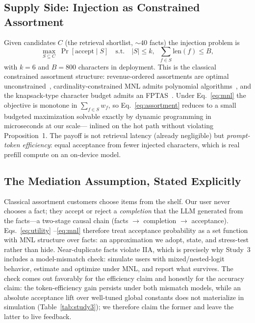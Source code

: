\documentclass[letterpaper]{article}
\begin{document}
\subsection{Supply Side: Injection as Constrained Assortment}

Given candidates $C$ (the retrieval shortlist, ${\sim}40$ facts) the
injection problem is
\begin{equation}
\label{eq:assortment}
\max_{S \subseteq C} \;\Pr[\text{accept} \mid S]
\quad \text{s.t.} \quad |S| \le k, \;\;
\sum_{f \in S} \mathrm{len}(f) \le B,
\end{equation}
with $k{=}6$ and $B{=}800$ characters in deployment. This is the classical
constrained assortment structure: revenue-ordered assortments are optimal
unconstrained~\citep{talluri2004revenue}, cardinality-constrained MNL
admits polynomial algorithms~\citep{rusmevichientong2010dynamic}, and the
knapsack-type character budget admits an FPTAS~\citep{desir2020capacitated}.
Under Eq.~\eqref{eq:mnl} the objective is monotone in $\sum_{f\in S} w_f$,
so Eq.~\eqref{eq:assortment} reduces to a small budgeted maximization
solvable exactly by dynamic programming in microseconds at our scale---%
inlined on the hot path without violating Proposition~1. The payoff is
not retrieval latency (already negligible) but \emph{prompt-token
efficiency}: equal acceptance from fewer injected characters, which is
real prefill compute on an on-device model.

\subsection{The Mediation Assumption, Stated Explicitly}

Classical assortment customers choose items from the shelf. Our user never
chooses a fact; they accept or reject a \emph{completion} that the LLM
generated from the facts---a two-stage causal chain
(facts $\to$ completion $\to$ acceptance). Eqs.~\eqref{eq:utility}%
--\eqref{eq:mnl} therefore treat acceptance probability as a set function
with MNL structure over facts: an approximation we adopt, state, and
stress-test rather than hide. Near-duplicate facts violate IIA, which is
precisely why Study~3 includes a model-mismatch check: simulate users with
mixed/nested-logit behavior, estimate and optimize under MNL, and report
what survives. The check comes out favorably for the efficiency claim
and honestly for the accuracy claim: the token-efficiency gain persists
under both mismatch models, while an absolute acceptance lift over
well-tuned global constants does not materialize in simulation
(Table~\ref{tab:study3}); we therefore claim the former and leave the
latter to live feedback.
\end{document}
